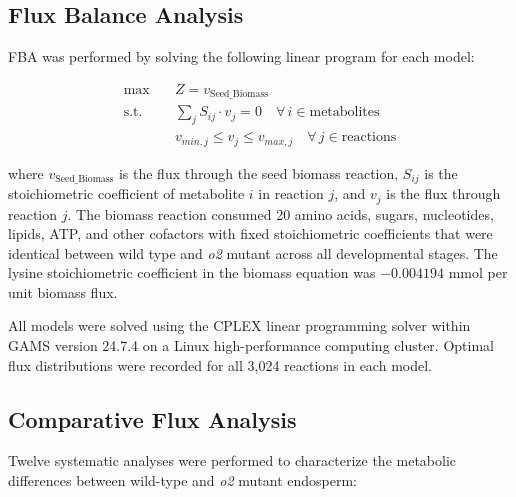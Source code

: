 \documentclass[12pt,a4paper]{article}
\begin{document}
\subsection{Flux Balance Analysis}

FBA was performed by solving the following linear program for each model:

\begin{align}
    \max \quad & Z = v_{\text{Seed\_Biomass}} \\
    \text{s.t.} \quad & \sum_{j} S_{ij} \cdot v_j = 0 \quad \forall \, i \in \text{metabolites} \\
    & v_{min,j} \leq v_j \leq v_{max,j} \quad \forall \, j \in \text{reactions}
\end{align}

where $v_{\text{Seed\_Biomass}}$ is the flux through the seed biomass reaction, $S_{ij}$ is the stoichiometric coefficient of metabolite $i$ in reaction $j$, and $v_j$ is the flux through reaction $j$. The biomass reaction consumed 20 amino acids, sugars, nucleotides, lipids, ATP, and other cofactors with fixed stoichiometric coefficients that were identical between wild type and \textit{o2} mutant across all developmental stages. The lysine stoichiometric coefficient in the biomass equation was $-0.004194$ mmol per unit biomass flux.

All models were solved using the CPLEX linear programming solver within GAMS version 24.7.4 on a Linux high-performance computing cluster. Optimal flux distributions were recorded for all 3,024 reactions in each model.

\subsection{Comparative Flux Analysis}

Twelve systematic analyses were performed to characterize the metabolic differences between wild-type and \textit{o2} mutant endosperm:
\end{document}
